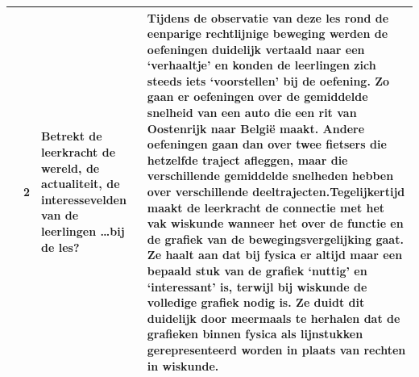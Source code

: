 \documentclass[a4paper,12pt,twoside]{article}%
\begin{document}
\begin{landscape}
	\begin{tabularx}{1.56\textwidth}{|Q{0.25\textwidth}|Q{0.1\textwidth}|Q{0.25\textwidth}|Q{0.85\textwidth}|}	& 2 & Betrekt de leerkracht de wereld, de actualiteit, de interessevelden van de leerlingen \ldots bij de les?  & Tijdens de observatie van deze les rond de eenparige rechtlijnige beweging werden de oefeningen duidelijk vertaald naar een `verhaaltje' en konden de leerlingen zich steeds iets `voorstellen' bij de oefening. Zo gaan er oefeningen over de gemiddelde snelheid van een auto die een rit van Oostenrijk naar Belgi\"e maakt. Andere oefeningen gaan dan over twee fietsers die hetzelfde traject afleggen, maar die verschillende gemiddelde snelheden hebben over verschillende deeltrajecten.\newline Tegelijkertijd maakt de leerkracht de connectie met het vak wiskunde wanneer het over de functie en de grafiek van de bewegingsvergelijking gaat. Ze haalt aan dat bij fysica er altijd maar een bepaald stuk van de grafiek `nuttig' en `interessant' is, terwijl bij wiskunde de volledige grafiek nodig is. Ze duidt dit duidelijk door meermaals te herhalen dat de grafieken binnen fysica als lijnstukken gerepresenteerd worden in plaats van rechten in wiskunde.  \\\hline	
	\end{tabularx}
\end{landscape}





	
	
	
	
	
%	
	



	
	
	
	
	
\end{document}
